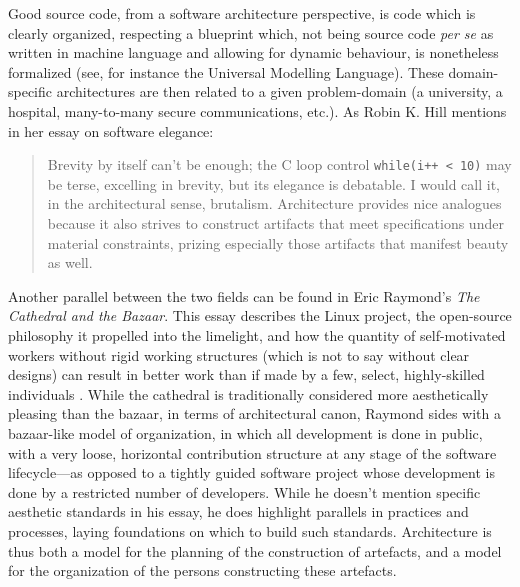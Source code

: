 Good source code, from a software architecture perspective, is code which is clearly organized, respecting a blueprint which, not being source code \emph{per se} as written in machine language and allowing for dynamic behaviour, is nonetheless formalized (see, for instance the Universal Modelling Language). These domain-specific architectures are then related to a given problem-domain (a university, a hospital, many-to-many secure communications, etc.). As Robin K. Hill mentions in her essay on software elegance:

\begin{quote}
  Brevity by itself can't be enough; the C loop control \lstinline{while(i++ < 10)} may be terse, excelling in brevity, but its elegance is debatable. I would call it, in the architectural sense, brutalism. Architecture provides nice analogues because it also strives to construct artifacts that meet specifications under material constraints, prizing especially those artifacts that manifest beauty as well. \citep{hill_what_2016}
\end{quote}

Another parallel between the two fields can be found in Eric Raymond's \emph{The Cathedral and the Bazaar}. This essay describes the Linux project, the open-source philosophy it propelled into the limelight, and how the quantity of self-motivated workers without rigid working structures (which is not to say without clear designs) can result in better work than if made by a few, select, highly-skilled individuals \citep{raymond_cathedral_2001}. While the cathedral is traditionally considered more aesthetically pleasing than the bazaar, in terms of architectural canon, Raymond sides with a bazaar-like model of organization, in which all development is done in public, with a very loose, horizontal contribution structure at any stage of the software lifecycle—as opposed to a tightly guided software project whose development is done by a restricted number of developers. While he doesn't mention specific aesthetic standards in his essay, he does highlight parallels in practices and processes, laying foundations on which to build such standards. Architecture is thus both a model for the planning of the construction of artefacts, and a model for the organization of the persons constructing these artefacts.

